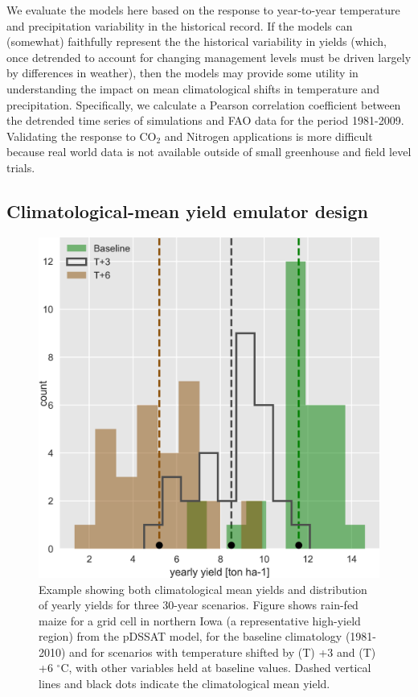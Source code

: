 \documentclass[preprint, 5p, times, twocolumn]{elsarticle}
\begin{document}
We evaluate the models here based on the response to year-to-year temperature and precipitation variability in the historical record. If the models can (somewhat) faithfully represent the the historical variability in yields (which, once detrended to account for changing management levels must be driven largely by differences in weather), then the models may provide some utility in understanding the impact on mean climatological shifts in temperature and precipitation. Specifically, we calculate a Pearson correlation coefficient between the detrended time series of simulations and FAO data for the period 1981-2009. Validating the response to CO$_2$ and Nitrogen applications is more difficult because real world data is not available outside of small greenhouse and field level trials.

\subsection{Climatological-mean yield emulator design}
\begin{figure}[!h]
\centering
   \includegraphics[width=0.95\linewidth]{hist_year.png}
   \caption{Example showing both climatological mean yields and distribution of yearly yields for three 30-year scenarios. Figure shows rain-fed maize for a grid cell in northern Iowa (a representative high-yield region) from the pDSSAT model, for the baseline climatology (1981-2010) and for scenarios with temperature shifted by (T) +3 and (T) +6 $^{\circ}$C, with other variables held at baseline values. Dashed vertical lines and black dots indicate the climatological mean yield.}
   \label{fig:yearly}
\end{figure}
\end{document}
